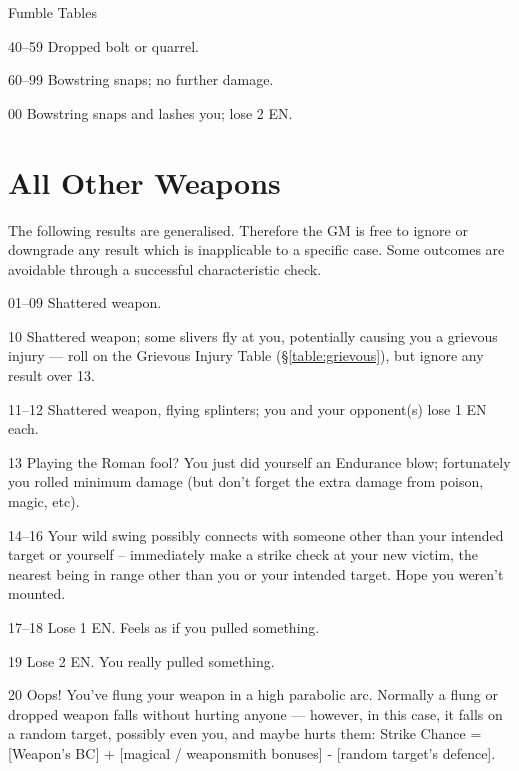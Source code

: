 \begin{Chapter}{Fumble Tables}
\begin{Description}
\item[40–59] Dropped bolt or quarrel.

\item[60–99] Bowstring snaps; no further damage.

\item[00] Bowstring snaps and lashes you; lose 2 EN.

\end{Description}

\section{All Other Weapons}
\label{fumble:others}
The following results are generalised.  Therefore the GM is free to
ignore or downgrade any result which is inapplicable to a specific
case.  Some outcomes are avoidable through a successful characteristic
check.

\begin{Description}
  
\item[01–09] Shattered weapon.

\item[10] Shattered weapon; some slivers fly at you, potentially
  causing you a grievous injury --- roll on the Grievous Injury Table
  (\S\ref{table:grievous}), but ignore any result over 13.

\item[11–12] Shattered weapon, flying splinters; you and your
  opponent(s) lose 1 EN each.

\item[13] Playing the Roman fool? You just did yourself an Endurance
  blow; fortunately you rolled minimum damage (but don’t forget the
  extra damage from poison, magic, etc).

\item[14–16] Your wild swing possibly connects with someone other than
  your intended target or yourself – immediately make a strike check
  at your new victim, the nearest being in range other than you or
  your intended target.  Hope you weren’t mounted.

\item[17–18] Lose 1 EN. Feels as if you pulled something.


\item[19] Lose 2 EN. You really pulled something.

\item[20] Oops! You’ve flung your weapon in a high parabolic
  arc. Normally a flung or dropped weapon falls without hurting anyone
  — however, in this case, it falls on a random target, possibly even
  you, and maybe hurts them: Strike Chance = [Weapon’s BC] + [magical
    / weaponsmith bonuses] - [random target’s defence].


\end{Description}
\end{Chapter}
